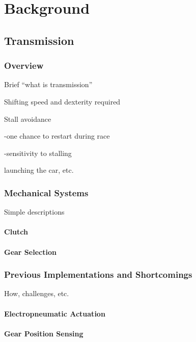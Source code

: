 \chapter{Background}


\section{Transmission}


\subsection{Overview}

Brief {}``what is transmission''

Shifting speed and dexterity required

Stall avoidance

-one chance to restart during race

-sensitivity to stalling

launching the car, etc.


\subsection{Mechanical Systems}

Simple descriptions


\subsubsection{Clutch}


\subsubsection{Gear Selection}


\subsection{Previous Implementations and Shortcomings}

How, challenges, etc.


\subsubsection{Electropneumatic Actuation}


\subsubsection{Gear Position Sensing}


